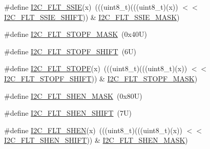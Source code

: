 \begin{DoxyCompactItemize}
\item 
\#define \mbox{\hyperlink{group___i2_c___register___masks_ga1002a3d1769dd5ddacefa1140f8003c0}{I2\+C\+\_\+\+F\+L\+T\+\_\+\+S\+S\+IE}}(x)~(((uint8\+\_\+t)(((uint8\+\_\+t)(x)) $<$$<$ \mbox{\hyperlink{group___i2_c___register___masks_ga6fa677ac36d808e9e048d3ab81623f8c}{I2\+C\+\_\+\+F\+L\+T\+\_\+\+S\+S\+I\+E\+\_\+\+S\+H\+I\+FT}})) \& \mbox{\hyperlink{group___i2_c___register___masks_ga532d6e283f53b115820f6a20f4f442a8}{I2\+C\+\_\+\+F\+L\+T\+\_\+\+S\+S\+I\+E\+\_\+\+M\+A\+SK}})
\item 
\#define \mbox{\hyperlink{group___i2_c___register___masks_ga49bb44800a0defc2dd1efb27263f7c52}{I2\+C\+\_\+\+F\+L\+T\+\_\+\+S\+T\+O\+P\+F\+\_\+\+M\+A\+SK}}~(0x40\+U)
\item 
\#define \mbox{\hyperlink{group___i2_c___register___masks_gae69dbb7d8bd1dff50e5c30846d3285bb}{I2\+C\+\_\+\+F\+L\+T\+\_\+\+S\+T\+O\+P\+F\+\_\+\+S\+H\+I\+FT}}~(6\+U)
\item 
\#define \mbox{\hyperlink{group___i2_c___register___masks_gaa7638f8d630f1911fcf5d5d3441ea4fb}{I2\+C\+\_\+\+F\+L\+T\+\_\+\+S\+T\+O\+PF}}(x)~(((uint8\+\_\+t)(((uint8\+\_\+t)(x)) $<$$<$ \mbox{\hyperlink{group___i2_c___register___masks_gae69dbb7d8bd1dff50e5c30846d3285bb}{I2\+C\+\_\+\+F\+L\+T\+\_\+\+S\+T\+O\+P\+F\+\_\+\+S\+H\+I\+FT}})) \& \mbox{\hyperlink{group___i2_c___register___masks_ga49bb44800a0defc2dd1efb27263f7c52}{I2\+C\+\_\+\+F\+L\+T\+\_\+\+S\+T\+O\+P\+F\+\_\+\+M\+A\+SK}})
\item 
\#define \mbox{\hyperlink{group___i2_c___register___masks_gac404fda03fc23c08a56018d6ab2fc977}{I2\+C\+\_\+\+F\+L\+T\+\_\+\+S\+H\+E\+N\+\_\+\+M\+A\+SK}}~(0x80\+U)
\item 
\#define \mbox{\hyperlink{group___i2_c___register___masks_ga5d6c7b67f99e1f592d199bb77f7d5605}{I2\+C\+\_\+\+F\+L\+T\+\_\+\+S\+H\+E\+N\+\_\+\+S\+H\+I\+FT}}~(7\+U)
\item 
\#define \mbox{\hyperlink{group___i2_c___register___masks_ga8b71d53a5730c117133239d8245be98f}{I2\+C\+\_\+\+F\+L\+T\+\_\+\+S\+H\+EN}}(x)~(((uint8\+\_\+t)(((uint8\+\_\+t)(x)) $<$$<$ \mbox{\hyperlink{group___i2_c___register___masks_ga5d6c7b67f99e1f592d199bb77f7d5605}{I2\+C\+\_\+\+F\+L\+T\+\_\+\+S\+H\+E\+N\+\_\+\+S\+H\+I\+FT}})) \& \mbox{\hyperlink{group___i2_c___register___masks_gac404fda03fc23c08a56018d6ab2fc977}{I2\+C\+\_\+\+F\+L\+T\+\_\+\+S\+H\+E\+N\+\_\+\+M\+A\+SK}})
\end{DoxyCompactItemize}
